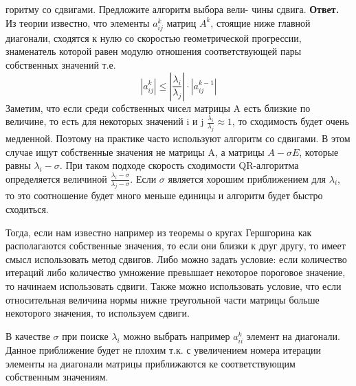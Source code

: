 \documentclass{article}
\begin{document}
\begin{enumerate}
        горитму со сдвигами. Предложите алгоритм выбора вели-
        чины сдвига.
        \newline
        {\bfseries Ответ. } 
        Из теории известно, что элементы $a_{ij}^k$ матриц $A^k$, стоящие ниже главной диагонали, сходятся к нулю со скоростью геометрической прогрессии, знаменатель которой равен модулю отношения соответствующей пары собственных значений т.е.
	\[
	|a_{ij}^k|\le|\frac{\lambda_i}{\lambda_j}| \cdot |a_{ij}^{k-1}|
	\]
	Заметим, что если среди собственных чисел матрицы A есть
	близкие по величине, то есть для некоторых значений i и j $\frac{\lambda_i}{\lambda_j} \approx 1$, то сходимость будет очень медленной. Поэтому на практике часто используют алгоритм со сдвигами. В этом случае ищут собственные значения не матрицы A, а матрицы $A-\sigma E$, которые равны $\lambda_i - \sigma$. При таком подходе скорость сходимости QR-алгоритма определяется величиной $\frac{\lambda_i-\sigma}{\lambda_j- \sigma}$. Если $\sigma$ является хорошим приближением для $\lambda_i$, то это соотношение будет много меньше единицы и алгоритм будет быстро сходиться.
	
	
	
	Тогда, если нам известно например из теоремы о кругах Гершгорина как располагаются собственные значения, то если они близки к друг другу, то имеет смысл использовать метод сдвигов. Либо можно задать условие: если количество итераций либо количество умножение превышает некоторое пороговое значение, то начинаем использовать сдвиги. Также можно использовать условие, что если относительная величина нормы нижне треугольной части матрицы больше некоторого значения, то используем сдвиги.
	
	
	В качестве $\sigma$ при поиске $\lambda_i$ можно выбрать например $a_{ii}^k$ элемент на диагонали. Данное приближение будет не плохим т.к. с увеличением номера итерации элементы на диагонали матрицы приближаются ке соответствующим собственным значениям.


\end{enumerate}
\end{document}
